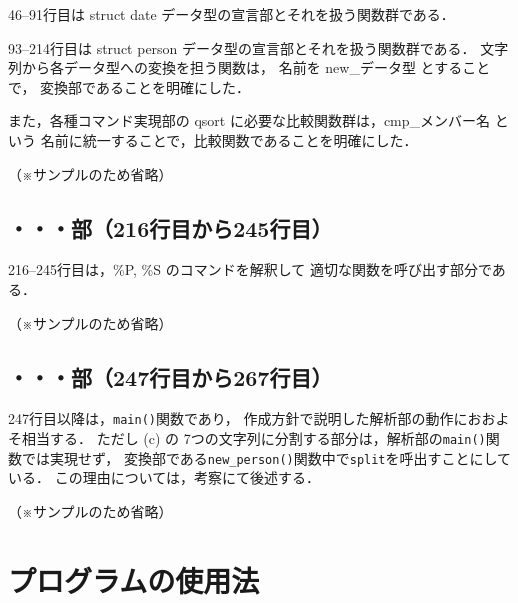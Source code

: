 \documentclass[a4j,11pt]{jarticle}
\begin{document}
46--91行目は struct date データ型の宣言部とそれを扱う関数群である．

93--214行目は struct person データ型の宣言部とそれを扱う関数群である．
文字列から各データ型への変換を担う関数は，
名前を new\_データ型 とすることで，
変換部であることを明確にした．

また，各種コマンド実現部の qsort に必要な比較関数群は，cmp\_メンバー名 という
名前に統一することで，比較関数であることを明確にした．

（※サンプルのため省略）

\subsection{・・・部（216行目から245行目）}

216--245行目は，\%P, \%S のコマンドを解釈して
適切な関数を呼び出す部分である．

（※サンプルのため省略）

\subsection{・・・部（247行目から267行目）}

247行目以降は，\verb|main()|関数であり，
作成方針で説明した解析部の動作におおよそ相当する．
ただし (c) の 7つの文字列に分割する部分は，解析部の\verb|main()|関数では実現せず，
変換部である\verb|new_person()|関数中で\verb|split|を呼出すことにしている．
この理由については，考察にて後述する．

（※サンプルのため省略）

\section{プログラムの使用法}

\end{document}
